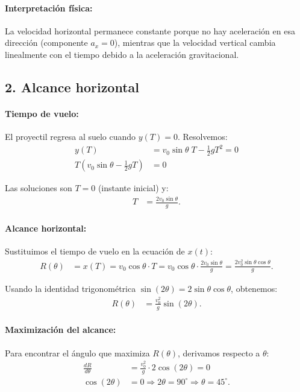 \documentclass[12pt,a4paper]{article}
\begin{document}
\paragraph{Interpretación física:} La velocidad horizontal permanece constante porque no hay aceleración en esa dirección (componente $a_x = 0$), mientras que la velocidad vertical cambia linealmente con el tiempo debido a la aceleración gravitacional.

\subsection*{2. Alcance horizontal}

\paragraph{Tiempo de vuelo:} El proyectil regresa al suelo cuando $y(T)=0$. Resolvemos:
\begin{align*}
y(T) &= v_0 \sin\theta \; T - \tfrac{1}{2} g T^2 = 0 \\
T(v_0 \sin\theta - \tfrac{1}{2} g T) &= 0
\end{align*}

Las soluciones son $T=0$ (instante inicial) y:
\begin{align*}
T &= \frac{2 v_0 \sin\theta}{g}.
\end{align*}

\paragraph{Alcance horizontal:} Sustituimos el tiempo de vuelo en la ecuación de $x(t)$:
\begin{align*}
R(\theta) &= x(T) = v_0 \cos\theta \cdot T 
= v_0 \cos\theta \cdot \frac{2 v_0 \sin\theta}{g}
= \frac{2 v_0^2 \sin\theta \cos\theta}{g}.
\end{align*}

Usando la identidad trigonométrica $\sin(2\theta) = 2\sin\theta\cos\theta$, obtenemos:
\begin{align*}
R(\theta) &= \frac{v_0^2}{g} \sin(2\theta).
\end{align*}

\paragraph{Maximización del alcance:} Para encontrar el ángulo que maximiza $R(\theta)$, derivamos respecto a $\theta$:
\begin{align*}
\frac{dR}{d\theta} &= \frac{v_0^2}{g} \cdot 2\cos(2\theta) = 0 \\
\cos(2\theta) &= 0 \Rightarrow 2\theta = 90^\circ \Rightarrow \theta = 45^\circ.
\end{align*}
\end{document}
